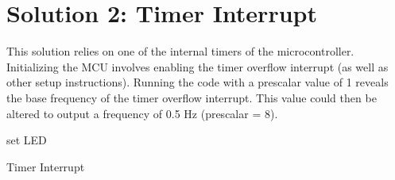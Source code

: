\documentclass{article}
\begin{document}

%



\section*{Solution 2:  Timer Interrupt}

This solution relies on one of the internal timers of the microcontroller. Initializing the MCU involves enabling the timer overflow interrupt (as well as other setup instructions). Running the code with a prescalar value of 1 reveals the base frequency of the timer overflow interrupt. This value could then be altered to output a frequency of 0.5 Hz (prescalar = 8).


\begin{center}
	\begin{minipage}{0.6\linewidth} %
		\begin{algorithm}[H]
			\medskip
			set LED \;
			\caption{Timer Interrupt} %
			\label{alg:Int}   %
		\end{algorithm}
	\end{minipage}
\end{center}




\end{document}
